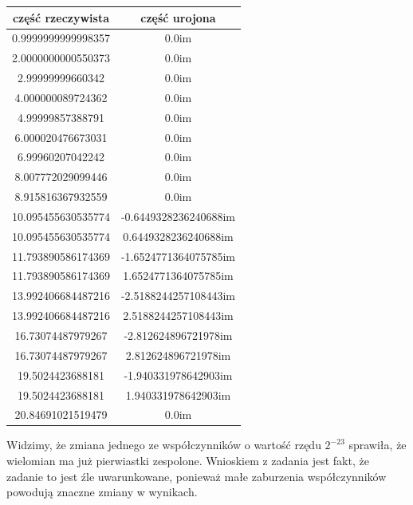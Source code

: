 \documentclass[]{article}
\begin{document}
	\begin{table}[h!]
		\centering
		\label{tab:table1}
		\begin{tabular}{|c|c|}
			\hline
			część rzeczywista & część urojona \\
			\hline
			0.9999999999998357 & 0.0im \\ \hline
			2.0000000000550373 & 0.0im \\ \hline
			2.99999999660342 & 0.0im \\ \hline
			4.000000089724362 & 0.0im \\ \hline
			4.99999857388791 & 0.0im \\ \hline
			6.000020476673031 & 0.0im \\ \hline
			6.99960207042242 & 0.0im \\ \hline
			8.007772029099446 & 0.0im \\ \hline
			8.915816367932559 & 0.0im \\ \hline
			10.095455630535774 & -0.6449328236240688im \\ \hline
			10.095455630535774 & 0.6449328236240688im \\ \hline
			11.793890586174369 & -1.6524771364075785im \\ \hline
			11.793890586174369 & 1.6524771364075785im \\ \hline
			13.992406684487216 & -2.5188244257108443im \\ \hline
			13.992406684487216 & 2.5188244257108443im \\ \hline
			16.73074487979267 & -2.812624896721978im \\ \hline
			16.73074487979267 & 2.812624896721978im \\ \hline
			19.5024423688181 & -1.940331978642903im \\ \hline
			19.5024423688181 & 1.940331978642903im \\ \hline
			20.84691021519479 & 0.0im \\ \hline
		\end{tabular}
	\end{table}
	
	Widzimy, że zmiana jednego ze współczynników o wartość rzędu $2^{-23}$ sprawiła, że wielomian ma już pierwiastki zespolone. Wnioskiem z zadania jest fakt, że zadanie to jest źle uwarunkowane, ponieważ małe zaburzenia współczynników powodują znaczne zmiany w wynikach.
	
	\clearpage
	
\end{document}
